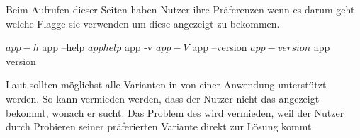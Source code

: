 \documentclass[oneside,bibliography=totocnumbered,BCOR=5mm]{scrbook}
\newenvironment{code}{\captionsetup{type=listing, skip=0pt}}{}
\begin{document}
Beim Aufrufen dieser Seiten haben Nutzer ihre Präferenzen wenn es darum geht
welche Flagge sie verwenden um diese angezeigt zu bekommen.

\begin{code}
  \begin{shellcode}
$ app -h
$ app --help
$ app help

$ app -v
$ app -V
$ app --version
$ app -version
$ app version
  \end{shellcode}
  \medskip
\end{code}

Laut \textcite{12factor} sollten möglichst alle Varianten in von einer Anwendung
unterstützt werden. So kann vermieden werden, dass der Nutzer nicht das
angezeigt bekommt, wonach er sucht. Das Problem des  wird vermieden, weil
der Nutzer durch Probieren seiner präferierten Variante direkt zur Lösung kommt.

\end{document}

